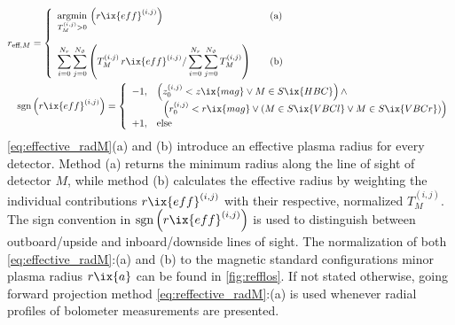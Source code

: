 %
                \begin{align}%
                    &r_{\text{eff}, M}=\left\{%
                    \begin{array}{ll}%
                        \underset{T^{\left(i,j\right)}_{M}>0}{\text{argmin}}\,\left(r\ix{eff}^{\left(i,j\right)}\right)&\quad\text{(a)}\\%
                        \,\\%
                        \displaystyle\sum_{i=0}^{N_{r}}\sum_{j=0}^{N_{\vartheta}}\left(T_{M}^{\left(i.j\right)}\,r\ix{eff}^{\left(i,j\right)}/\sum_{i=0}^{N_{r}}\sum_{j=0}^{N_{\vartheta}}T_{M}^{\left(i,j\right)}\right)&\quad\text{(b)}%
                    \end{array}\right.\label{eq:effective_radM}\\%
                    &\quad\text{sgn}\left(r\ix{eff}^{\left(i,j\right)}\right)=\left\{%
                    \begin{array}{ll}%
                        -1,&\left(z_{0}^{\left(i,j\right)}<z\ix{mag}\vee M\in S\ix{HBC}\right)\wedge\\%
                        &\,\,\,\,\left(r_{0}^{\left(i,j\right)}<r\ix{mag}\vee\left(M\in S\ix{VBCl}\vee M\in S\ix{VBCr}\right)\right)\\%
                        +1,&\text{else}%
                    \end{array}\right.\nonumber%
                \end{align}%
%
                \autoref{eq:effective_radM}(a) and (b) introduce an effective plasma radius for every detector. Method (a) returns the minimum radius along the line of sight of detector $M$, while method (b) calculates the effective radius by weighting the individual contributions $r\ix{eff}^{\left(i,j\right)}$ with their respective, normalized $T_{M}^{\left(i,j\right)}$. The sign convention in $\text{sgn}\left(r\ix{eff}^{\left(i,j\right)}\right)$ is used to distinguish between outboard/upside and inboard/downside lines of sight. The normalization of both \cref{eq:effective_radM}:(a) and (b) to the magnetic standard configurations minor plasma radius $r\ix{a}$ can be found in \cref{fig:refflos}. If not stated otherwise, going forward projection method \cref{eq:reffective_radM}:(a) is used whenever radial profiles of bolometer measurements are presented.\\%
